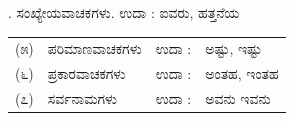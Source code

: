 \vspace{2.5pt plus 3pt minus 0.5pt}\noindent\hspace*{1.2em}\hspace{0.55em}. ಸಂಖ್ಯೇಯವಾಚಕಗಳು. ಉದಾ : ಐವರು, ಹತ್ತನೆಯ\par

\vspace{4pt plus 3pt minus 1pt}
\begin{center}
{\renewcommand{\arraystretch}{1.22}\setlength{\tabcolsep}{5pt}
\begin{tabular}{r l c l}
(೫) & ಪರಿಮಾಣವಾಚಕಗಳು & ಉದಾ : & ಅಷ್ಟು, ಇಷ್ಟು \\
(೬) & ಪ್ರಕಾರವಾಚಕಗಳು & ಉದಾ : & ಅಂತಹ, ಇಂತಹ \\
(೭) & ಸರ್ವನಾಮಗಳು & ಉದಾ : & ಅವನು ಇವನು \\
\end{tabular}}
\end{center}
\vspace{4pt plus 3pt minus 1pt}
